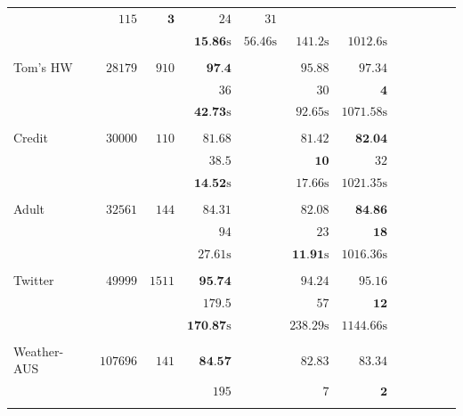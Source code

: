 \begin{table}
\begin{center}
\begin{tabular}{l  r  r r r r r r r rrr}
			& $   115 $    & $   \textbf{3} $    & $   24 $    & $   31 $   \\ & & 
			& $   \textbf{15.86} \text{s}  $    & $   56.46 \text{s}  $    & $   141.2 \text{s}  $    & $   1012.6 \text{s}  $   \\\\ 
			{ Tom's HW}   & $  28179 $  & $  910 $  & $   \textbf{97.4}  $    &   \multicolumn{1}{c}{\multirow{3}{*}{\textemdash}}       & $   95.88  $    & $   97.34  $   \\ & & 
			& $   36 $    &       & $   30 $    & $   \textbf{4} $   \\ & & 
			& $   \textbf{42.73} \text{s}  $    &       & $   92.65 \text{s}  $    & $   1071.58 \text{s}  $   \\\\ 
			{ Credit}   & $  30000 $  & $  110 $  & $   81.68  $    &   \multicolumn{1}{c}{\multirow{3}{*}{\textemdash}}       & $   81.42  $    & $  \textbf{ 82.04}  $   \\ & & 
			& $   38.5  $    &       & $   \textbf{10} $    & $   32 $   \\ & & 
			& $   \textbf{14.52} \text{s}  $    &       & $   17.66 \text{s}  $    & $   1021.35 \text{s}  $   \\\\ 
			{ Adult}   & $  32561 $  & $  144 $  & $   84.31  $    &   \multicolumn{1}{c}{\multirow{3}{*}{\textemdash}}       & $   82.08  $    & $   \textbf{84.86}  $   \\ & & 
			& $   94 $    &       & $   23 $    & $   \textbf{18} $   \\ & & 
			& $   27.61 \text{s}  $    &       & $   \textbf{11.91} \text{s}  $    & $   1016.36 \text{s}  $   \\\\ 
			{ Twitter}   & $  49999 $  & $  1511 $  & $   \textbf{95.74}  $    &   \multicolumn{1}{c}{\multirow{3}{*}{\textemdash}}       & $   94.24  $    & $   95.16  $   \\ & & 
			& $   179.5  $    &       & $   57 $    & $   \textbf{12} $   \\ & & 
			& $   \textbf{170.87} \text{s}  $    &       & $   238.29 \text{s}  $    & $   1144.66 \text{s}  $   \\\\ 
			{ Weather-AUS}   & $  107696 $  & $  141 $  & $   \textbf{84.57}  $    &   \multicolumn{1}{c}{\multirow{3}{*}{\textemdash}}       & $   82.83  $    & $   83.34  $   \\ & & 
			& $   195 $    &       & $   7 $    & $   \textbf{2} $   \\ & & 

\end{tabular}
\end{center}
\end{table}
